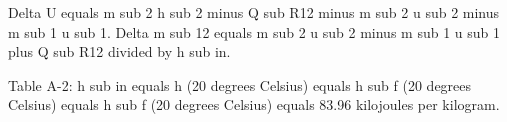 Delta U equals m sub 2 h sub 2 minus Q sub R12 minus m sub 2 u sub 2 minus m sub 1 u sub 1.  
Delta m sub 12 equals m sub 2 u sub 2 minus m sub 1 u sub 1 plus Q sub R12 divided by h sub in.  

Table A-2: h sub in equals h (20 degrees Celsius) equals h sub f (20 degrees Celsius) equals h sub f (20 degrees Celsius) equals 83.96 kilojoules per kilogram.
